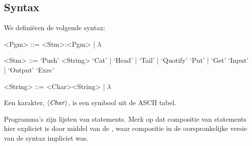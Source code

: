 \subsection{Syntax}
\label{sec:def:syn}
We definiëren de volgende syntax:
\setlength{\grammarindent}{5em}
\begin{grammar}
	<Pgm> ::= <Stm>:<Pgm> | $\lambda$ %

	<Stm> ::= `Push' <String>
		\alt `Cat' | `Head' | `Tail' | `Quotify'
		\alt `Put' | `Get'
		\alt `Input' | `Output'
		\alt `Exec'

	<String> ::= <Char><String> | $\lambda$
\end{grammar}

Een karakter, $\langle\mathit{Char}\rangle$, is een symbool uit de ASCII tabel.

Programma's zijn lijsten van statements. Merk op dat compositie van statements
hier expliciet is door middel van de \lit{:}, waar compositie in de
oorspronkelijke versie van de syntax impliciet was.
